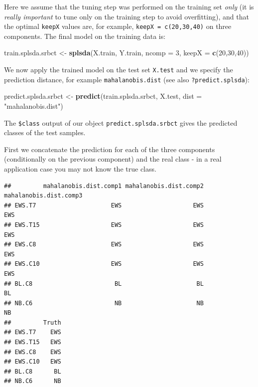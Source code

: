 \documentclass[]{book}
\newenvironment{Shaded}{\begin{snugshade}}{\end{snugshade}}
\newcommand{\CommentTok}[1]{\textcolor[rgb]{0.56,0.35,0.01}{\textit{#1}}}
\newcommand{\DataTypeTok}[1]{\textcolor[rgb]{0.13,0.29,0.53}{#1}}
\newcommand{\DecValTok}[1]{\textcolor[rgb]{0.00,0.00,0.81}{#1}}
\newcommand{\KeywordTok}[1]{\textcolor[rgb]{0.13,0.29,0.53}{\textbf{#1}}}
\newcommand{\NormalTok}[1]{#1}
\newcommand{\OperatorTok}[1]{\textcolor[rgb]{0.81,0.36,0.00}{\textbf{#1}}}
\newcommand{\StringTok}[1]{\textcolor[rgb]{0.31,0.60,0.02}{#1}}
\begin{document}
Here we assume that the tuning step was performed on the training set \emph{only} (it is \emph{really important} to tune only on the training step to avoid overfitting), and that the optimal \texttt{keepX} values are, for example, \texttt{keepX\ =\ c(20,30,40)} on three components. The final model on the training data is:

\begin{Shaded}
\begin{Highlighting}[]
\NormalTok{train.splsda.srbct <-}\StringTok{ }\KeywordTok{splsda}\NormalTok{(X.train, Y.train, }\DataTypeTok{ncomp =} \DecValTok{3}\NormalTok{, }\DataTypeTok{keepX =} \KeywordTok{c}\NormalTok{(}\DecValTok{20}\NormalTok{,}\DecValTok{30}\NormalTok{,}\DecValTok{40}\NormalTok{))}
\end{Highlighting}
\end{Shaded}

We now apply the trained model on the test set \texttt{X.test} and we specify the prediction distance, for example \texttt{mahalanobis.dist} (see also \texttt{?predict.splsda}):

\begin{Shaded}
\begin{Highlighting}[]
\NormalTok{predict.splsda.srbct <-}\StringTok{ }\KeywordTok{predict}\NormalTok{(train.splsda.srbct, X.test, }
                                \DataTypeTok{dist =} \StringTok{"mahalanobis.dist"}\NormalTok{)}
\end{Highlighting}
\end{Shaded}

The \texttt{\$class} output of our object \texttt{predict.splsda.srbct} gives the predicted classes of the test samples.

First we concatenate the prediction for each of the three components (conditionally on the previous component) and the real class - in a real application case you may not know the true class.

\begin{Shaded}
\end{Shaded}

\begin{verbatim}
##         mahalanobis.dist.comp1 mahalanobis.dist.comp2 mahalanobis.dist.comp3
## EWS.T7                     EWS                    EWS                    EWS
## EWS.T15                    EWS                    EWS                    EWS
## EWS.C8                     EWS                    EWS                    EWS
## EWS.C10                    EWS                    EWS                    EWS
## BL.C8                       BL                     BL                     BL
## NB.C6                       NB                     NB                     NB
##         Truth
## EWS.T7    EWS
## EWS.T15   EWS
## EWS.C8    EWS
## EWS.C10   EWS
## BL.C8      BL
## NB.C6      NB
\end{verbatim}
\end{document}
